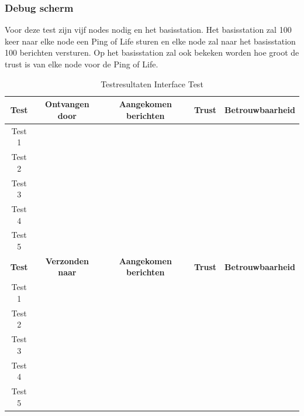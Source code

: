 \subsubsection{Debug scherm}
Voor deze test zijn vijf nodes nodig en het basisstation. Het basisstation zal 100 keer naar elke node een Ping of Life sturen en elke node zal 
naar het basisstation 100 berichten versturen. Op het basisstation zal ook bekeken worden hoe groot de trust is van elke node voor de Ping of Life.

\begin{table}[h]
    \centering
    \begin{tabular}{|c||c|c|c|c|}
        \textbf{Test}   &   \textbf{Ontvangen door} & \textbf{Aangekomen berichten} &   \textbf{Trust}  &   \textbf{Betrouwbaarheid}    \\\hline
        Test 1          &                           &                               &                   &                               \\\hline 
        Test 2          &                           &                               &                   &                               \\\hline 
        Test 3          &                           &                               &                   &                               \\\hline 
        Test 4          &                           &                               &                   &                               \\\hline 
        Test 5          &                           &                               &                   &                               \\\hline 
        \textbf{Test}   &   \textbf{Verzonden naar} & \textbf{Aangekomen berichten} &   \textbf{Trust}  &   \textbf{Betrouwbaarheid}    \\\hline
        Test 1          &                           &                               &                   &                               \\\hline 
        Test 2          &                           &                               &                   &                               \\\hline 
        Test 3          &                           &                               &                   &                               \\\hline 
        Test 4          &                           &                               &                   &                               \\\hline 
        Test 5          &                           &                               &                   &                               \\\hline 
    \end{tabular}
    \caption{Testresultaten Interface Test}
    \label{Test:Int}
\end{table}

